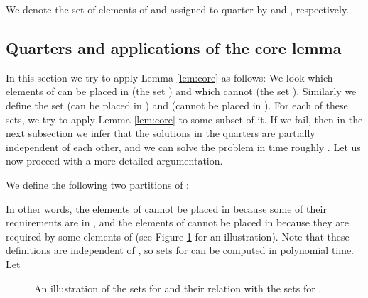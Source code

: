 \documentclass{article}
\theoremstyle{definition}
\begin{document}
We denote the set of elements of  and  assigned to quarter  by  and , respectively.

\subsection{Quarters and applications of the core lemma}\label{sec:appl-core}

In this section we try to apply Lemma \ref{lem:core} as follows:
We look which elements of  can be placed in  (the set ) and which cannot (the set ).
Similarly we define the set  (can be placed in ) and  (cannot be placed in ).
For each of these sets, we try to apply Lemma \ref{lem:core} to some subset of it.
If we fail, then in the next subsection we infer that the solutions in the quarters are partially independent of
each other, and we can solve the problem in time roughly .
Let us now proceed with a more detailed argumentation.

We define the following two partitions of :

In other words, the elements of  cannot be placed in  because some of their requirements are in ,
   and the elements of  cannot be placed in  because they are required by some elements of  (see Figure \ref{fig:PA} for an illustration).
 Note that these definitions are independent of , so sets  for  can be computed in polynomial time. Let 


\begin{figure}[htbp]
\begin{center}
\caption{An illustration of the sets  for  and their relation
  with the sets  for .}
\label{fig:PA}
\end{center}
\end{figure}
\end{document}
